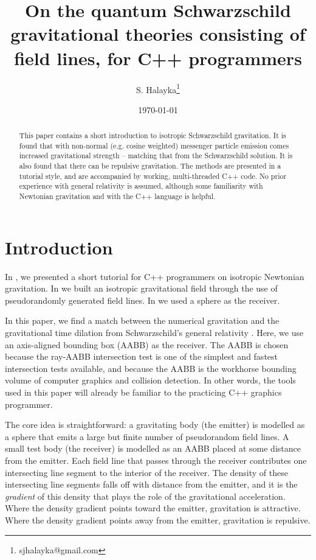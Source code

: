 \documentclass[10pt]{article}
\title{On the quantum Schwarzschild gravitational theories consisting of field lines, for C++ programmers}
\author{S. Halayka\footnote{sjhalayka@gmail.com}}
\date{\today\;\currenttime}
\begin{document}



\maketitle

\begin{abstract}
This paper contains a short introduction to isotropic Schwarzschild gravitation.
It is found that with non-normal (e.g. cosine weighted) messenger particle emission comes increased gravitational strength -- matching that from the Schwarzschild solution.
It is also found that there can be repulsive gravitation.
The methods are presented in a tutorial style, and are accompanied by working, multi-threaded C++ code.
No prior experience with general relativity is assumed, although some familiarity with Newtonian gravitation and with the C++ language is helpful.
\end{abstract}




\section{Introduction}

In \cite{halayka}, we presented a short tutorial for C++ programmers on isotropic Newtonian gravitation.
In \cite{halayka} we built an isotropic gravitational field through the use of pseudorandomly generated field lines.
In \cite{halayka} we used a sphere as the receiver.

In this paper, we find a match between the numerical gravitation and the gravitational time dilation from Schwarzschild's general relativity \cite{hooft, misner}.
Here, we use an axis-aligned bounding box (AABB) as the receiver.
The AABB is chosen because the ray-AABB intersection test is one of the simplest and fastest intersection tests available, and because the AABB is the workhorse bounding volume of computer graphics and collision detection.
In other words, the tools used in this paper will already be familiar to the practicing C++ graphics programmer.

The core idea is straightforward: a gravitating body (the emitter) is modelled as a sphere that emits a large but finite number of pseudorandom field lines.
A small test body (the receiver) is modelled as an AABB placed at some distance from the emitter.
Each field line that passes through the receiver contributes one intersecting line segment to the interior of the receiver.
The density of these intersecting line segments falls off with distance from the emitter, and it is the {\em gradient} of this density that plays the role of the gravitational acceleration.
Where the density gradient points toward the emitter, gravitation is attractive.
Where the density gradient points away from the emitter, gravitation is repulsive.
\end{document}
